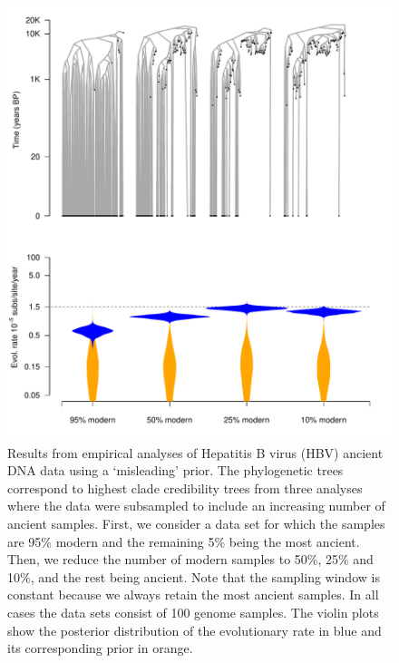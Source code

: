\documentclass[11pt]{article}
\begin{document}
\begin{figure}[H]
    \begin{center}
        \includegraphics[scale=0.7, angle=0]{empirical_results_biased_misleading_prior.pdf}
        \caption{Results from empirical analyses of Hepatitis B virus (HBV) ancient DNA data using a `misleading' prior. The phylogenetic trees correspond to highest clade credibility trees from three analyses where the data were subsampled to include an increasing number of ancient samples. First, we consider a data set for which the samples are 95\% modern and the remaining 5\% being the most ancient. Then, we reduce the number of modern samples to 50\%, 25\% and 10\%, and the rest being ancient. Note that the sampling window is constant because we always retain the most ancient samples. In all cases the data sets consist of 100 genome samples. The violin plots show the posterior distribution of the evolutionary rate in blue and its corresponding prior in orange.}
        \label{figure:Fig7}
    \end{center}
\end{figure}
\end{document}

